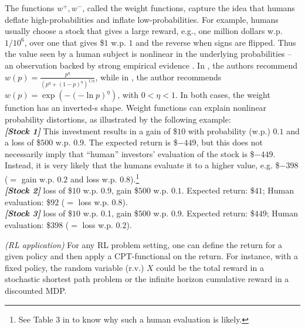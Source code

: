 The functions $w^+, w^-$, called the weight functions, capture the idea that humans deflate high-probabilities and inflate low-probabilities.
For example, humans usually choose a stock that gives a large reward, e.g., 
one million dollars w.p. $1/10^6$, over one that gives \$$1$ w.p. $1$ and the reverse when signs are flipped. 
Thus the value seen by a human subject is nonlinear in the underlying probabilities -- an observation backed by strong empirical evidence \cite{tversky1992advances,Barberis:2012vs}.  
In \cite{tversky1992advances}, the authors recommend $w(p) = \frac{p^{\eta}}{{(p^{\eta}+ (1-p)^{\eta})}^{1/\eta}}$, while in \cite{prelec1998probability}, the author recommends $w(p) = \exp(-(-\ln p)^\eta)$, with $0 < \eta <1$. In both cases, the weight function has an inverted-s shape.
Weight functions can explain nonlinear probability distortions, as illustrated by the following example: \\
\textit{\textbf{[Stock 1]}} This investment results in a gain of \$$10$ with probability (w.p.) $0.1$ and a loss of \$$500$ w.p. $0.9$. The expected return is \$$-449$, but this does not necessarily imply that ``human'' investors' evaluation of the stock is \$$-449$. Instead, it is very likely that the humans evaluate it to a higher value, e.g. \$$-398$ ($=$ gain w.p. $0.2$ and loss w.p. $0.8$).\footnote{See Table 3 in \cite{tversky1992advances} to know why such a human evaluation is likely.}\\
\textit{\textbf{[Stock 2]}} loss of \$$10$ w.p. $0.9$, gain \$$500$ w.p. $0.1$. Expected return: \$$41$; Human evaluation: \$$92$ ($=$ loss w.p. $0.8$).\\
\textit{\textbf{[Stock 3]}} loss of \$$10$ w.p. 0.1, gain \$$500$ w.p. $0.9$. Expected return: \$$449$; Human evaluation: \$$398$ ($=$ loss w.p. $0.2$). 
\fi



\begin{remark}\textit{(RL application)}
For any RL problem setting, one can define the return for a given policy and then apply a CPT-functional on the return. For instance, with a fixed policy, the random variable (r.v.) $X$ could be the total reward in a stochastic shortest path problem or the infinite horizon cumulative reward in a discounted MDP.
\end{remark}


